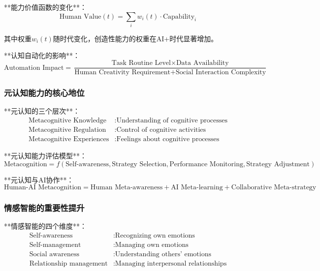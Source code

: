 **能力价值函数的变化**：
\begin{equation}
\text{Human Value}(t) = \sum_{i} w_i(t) \cdot \text{Capability}_i
\end{equation}

其中权重$w_i(t)$随时代变化，创造性能力的权重在AI+时代显著增加。

**认知自动化的影响**：
\begin{equation}
\text{Automation Impact} = \frac{\text{Task Routine Level} \times \text{Data Availability}}{\text{Human Creativity Requirement} + \text{Social Interaction Complexity}}
\end{equation}

\subsubsection{元认知能力的核心地位} %

**元认知的三个层次**：
\begin{align}
\text{Metacognitive Knowledge} &: \text{Understanding of cognitive processes} \\
\text{Metacognitive Regulation} &: \text{Control of cognitive activities} \\
\text{Metacognitive Experiences} &: \text{Feelings about cognitive processes}
\end{align}

**元认知能力评估模型**：
\begin{equation}
\text{Metacognition} = f(\text{Self-awareness}, \text{Strategy Selection}, \text{Performance Monitoring}, \text{Strategy Adjustment})
\end{equation}

**元认知与AI协作**：
\begin{equation}
\text{Human-AI Metacognition} = \text{Human Meta-awareness} + \text{AI Meta-learning} + \text{Collaborative Meta-strategy}
\end{equation}

\subsubsection{情感智能的重要性提升} %

**情感智能的四个维度**：
\begin{align}
\text{Self-awareness} &: \text{Recognizing own emotions} \\
\text{Self-management} &: \text{Managing own emotions} \\
\text{Social awareness} &: \text{Understanding others' emotions} \\
\text{Relationship management} &: \text{Managing interpersonal relationships}
\end{align}

